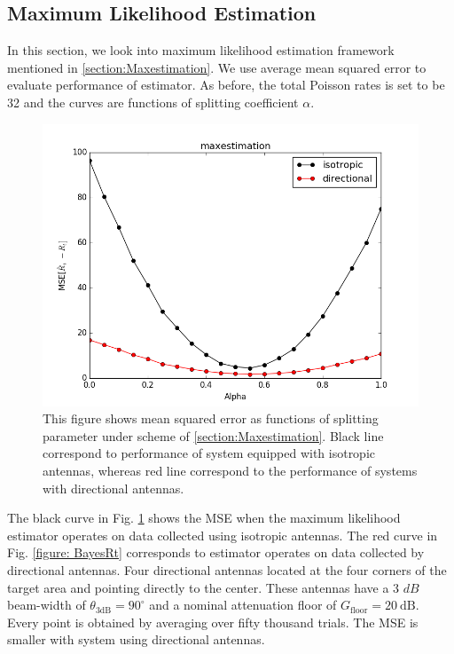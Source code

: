 \subsection{Maximum Likelihood Estimation}
In this section, we look into maximum likelihood estimation framework mentioned in \ref{section:Maxestimation}. We use average mean squared error to evaluate performance of estimator. As before, the total Poisson rates is set to be 32 and the curves are functions of splitting coefficient $\alpha$.
\begin{figure}[]
	\centering
	\includegraphics[scale=0.6]{Figures/MaxRt.png}
	\caption{This figure shows mean squared error as functions of splitting parameter under scheme of \ref{section:Maxestimation}. Black line correspond to performance of system equipped with isotropic antennas, whereas red line correspond to the performance of systems with directional antennas. }
	\label{figure: MaxRt}
\end{figure}
The black curve in Fig. \ref{figure: MaxRt} shows the MSE when the maximum likelihood estimator operates on data collected using isotropic antennas. The red curve in Fig. \ref{figure: BayesRt} corresponds to estimator operates on data collected by directional antennas. Four directional antennas located at the four corners of the target area and pointing directly to the center.
These antennas have a 3 $dB$ beam-width of $\theta_{\mathrm{3dB}} = 90^{\circ}$ and a nominal attenuation floor of $G_{\mathrm{floor}} = 20~\mathrm{dB}$.
Every point is obtained by averaging over fifty thousand trials. The MSE is smaller with system using directional antennas.

